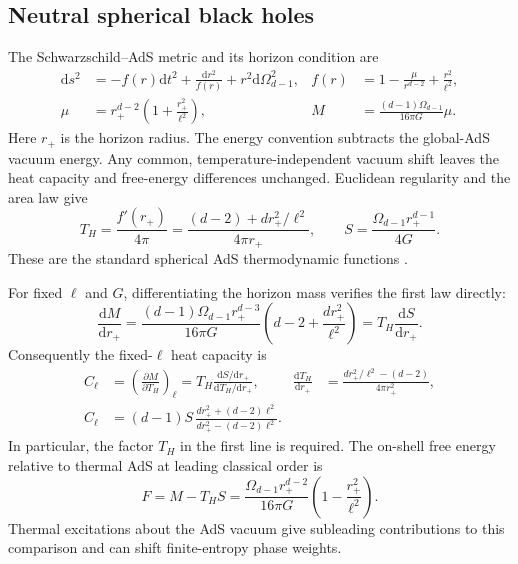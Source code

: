 \documentclass[11pt,letterpaper]{article}
\newcommand{\dd}{\mathrm{d}}
\theoremstyle{plain}
\theoremstyle{definition}
\theoremstyle{remark}
\begin{document}
\subsection{Neutral spherical black holes}
\label{app11:neutral}

The Schwarzschild--AdS metric and its horizon condition are
\begin{align}
 \dd s^2&=-f(r)\dd t^2+\frac{\dd r^2}{f(r)}
                 +r^2\dd\Omega_{d-1}^2,
 & f(r)&=1-\frac{\mu}{r^{d-2}}+\frac{r^2}{\ell^2},
 \label{eq11:neutral_metric}\\
 \mu&=r_+^{d-2}\left(1+\frac{r_+^2}{\ell^2}\right),
 & M&=\frac{(d-1)\Omega_{d-1}}{16\pi G}\mu .
 \label{eq11:neutral_mass}
\end{align}
Here $r_+$ is the horizon radius.  The energy convention subtracts the
global-AdS vacuum energy.  Any common, temperature-independent vacuum
shift leaves the heat capacity and free-energy differences unchanged.
Euclidean regularity and the area law give
\begin{equation}
 T_H=\frac{f'(r_+)}{4\pi}
     =\frac{(d-2)+d r_+^2/\ell^2}{4\pi r_+},
 \qquad S=\frac{\Omega_{d-1}r_+^{d-1}}{4G}.
 \label{eq11:neutral_temperature_entropy}
\end{equation}
These are the standard spherical AdS thermodynamic functions
\cite{hawkingpage1983,witten1998}.

For fixed $\ell$ and $G$, differentiating the horizon mass verifies the
first law directly:
\begin{equation}
 \frac{\dd M}{\dd r_+}
 =\frac{(d-1)\Omega_{d-1}r_+^{d-3}}{16\pi G}
       \left(d-2+\frac{d r_+^2}{\ell^2}\right)
 =T_H\frac{\dd S}{\dd r_+}.
 \label{eq11:neutral_first_law}
\end{equation}
Consequently the fixed-$\ell$ heat capacity is
\begin{align}
 C_\ell&=\left(\frac{\partial M}{\partial T_H}\right)_\ell
   =T_H\frac{\dd S/\dd r_+}{\dd T_H/\dd r_+},
 &\frac{\dd T_H}{\dd r_+}
   &=\frac{d r_+^2/\ell^2-(d-2)}{4\pi r_+^2},
 \label{eq11:neutral_capacity_derivative}\\
 C_\ell&=(d-1)S\,
       \frac{d r_+^2+(d-2)\ell^2}{d r_+^2-(d-2)\ell^2}.
 \label{eq11:neutral_capacity}
\end{align}
In particular, the factor $T_H$ in the first line is required.  The
on-shell free energy relative to thermal AdS at leading classical order
is
\begin{equation}
 F=M-T_HS
  =\frac{\Omega_{d-1}r_+^{d-2}}{16\pi G}
      \left(1-\frac{r_+^2}{\ell^2}\right).
 \label{eq11:neutral_free_energy}
\end{equation}
Thermal excitations about the AdS vacuum give subleading contributions
to this comparison and can shift finite-entropy phase weights.
\end{document}
